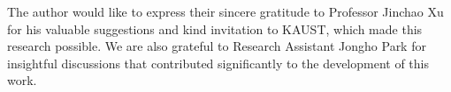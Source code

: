 \documentclass[review,onefignum,onetabnum,onealgnum]{siamart250106}
\numberwithin{theorem}{section}
\begin{document}
The author would like to express their sincere gratitude to Professor Jinchao Xu for his valuable suggestions and kind invitation to KAUST, which made this research possible. We are also grateful to Research Assistant Jongho Park for insightful discussions that contributed significantly to the development of this work.






\end{document}

